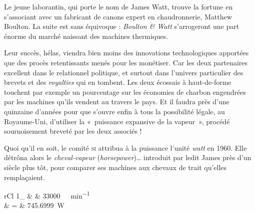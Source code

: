 	Le jeune laborantin, qui porte le nom de James Watt, trouve la fortune en s’associant avec un fabricant de canons expert en chaudronnerie, Matthew \mbox{Boulton}. La suite est sans équivoque : \textit{Boulton \& Watt} s’arrogeront une part énorme du marché naissant des machines thermiques.

	Leur succès, hélas, viendra bien moins des innovations technologiques apportées que des procès retentissants menés pour les monétiser. Car les deux partenaires excellent dans le relationnel politique, et surtout dans l’univers particulier des brevets et des \textit{royalties} qui en tombent. Les deux écossais à haut-de-forme touchent par exemple un pourcentage sur les économies de charbon engendrées par les machines qu’ils vendent au travers le pays. Et il faudra près d’une quinzaine d’années pour que s’ouvre enfin à tous la possibilité légale, au Royaume-Uni, d’utiliser la «~puissance expansive de la vapeur~», procédé sournoisement breveté par les deux associés !

	Quoi qu’il en soit, le comité \textsc{si} attribua à la puissance l’unité \emph{watt} en 1960. Elle détrôna alors le \emph{cheval-vapeur} (\textit{horsepower})… introduit par ledit James près d’un siècle plus tôt, pour comparer ses machines aux chevaux de trait qu’elles remplaçaient.
	\begin{IEEEeqnarray*}{rCl}
		\SI{1}{\cheval}_ 	& \equiv & \SI{33 000}{\foot\lbf\per\minute}\\
													& = & \SI{745.6999}{\watt}
	\end{IEEEeqnarray*}
	
\atendofhistorysection
